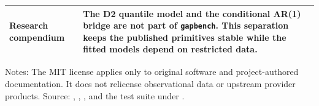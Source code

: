 \begin{table}[p]
\begin{tabular}{>{\raggedright\arraybackslash}p{}>{\raggedright\arraybackslash}p{}}
Research compendium & The D2 quantile model and the conditional AR(1) bridge are not part of \texttt{gapbench}. This separation keeps the published primitives stable while the fitted models depend on restricted data. \\
\bottomrule
\end{tabular}
\par\smallskip\footnotesize Notes: The MIT license applies only to original software and project-authored documentation. It does not relicense observational data or upstream provider products. Source: , , , and the test suite under .
\end{table}
